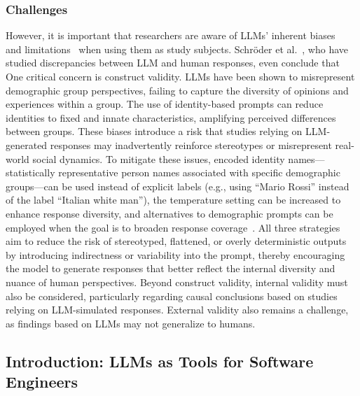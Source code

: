 \subsubsection{Challenges}

However, it is important that researchers are aware of LLMs' inherent biases~\cite{Crowell2023} and limitations~\cite{DBLP:journals/ais/HardingDLL24, DBLP:journals/corr/abs-2402-01908} when using them as study subjects. 
Schröder et al.~\cite{schroeder2025llmspsychology}, who have studied discrepancies between LLM and human responses, even conclude that 
One critical concern is construct validity. LLMs have been shown to misrepresent demographic group perspectives, failing to capture the diversity of opinions and experiences within a group.
The use of identity-based prompts can reduce identities to fixed and innate characteristics, amplifying perceived differences between groups.
These biases introduce a risk that studies relying on LLM-generated responses may inadvertently reinforce stereotypes or misrepresent real-world social dynamics.
To mitigate these issues, encoded identity names---statistically representative person names associated with specific demographic groups---can be used instead of explicit labels (e.g., using ``Mario Rossi'' instead of the label ``Italian white man''), the temperature setting can be increased to enhance response diversity, and alternatives to demographic prompts can be employed when the goal is to broaden response coverage~\cite{DBLP:journals/corr/abs-2402-01908}.
All three strategies aim to reduce the risk of stereotyped, flattened, or overly deterministic outputs by introducing indirectness or variability into the prompt, thereby encouraging the model to generate responses that better reflect the internal diversity and nuance of human perspectives.
Beyond construct validity, internal validity must also be considered, particularly regarding causal conclusions based on studies relying on LLM-simulated responses.
External validity also remains a challenge, as findings based on LLMs may not generalize to humans.


\subsection{Introduction: LLMs as Tools for Software Engineers}
\label{sec:llms-as-tools-for-software-engineers}

